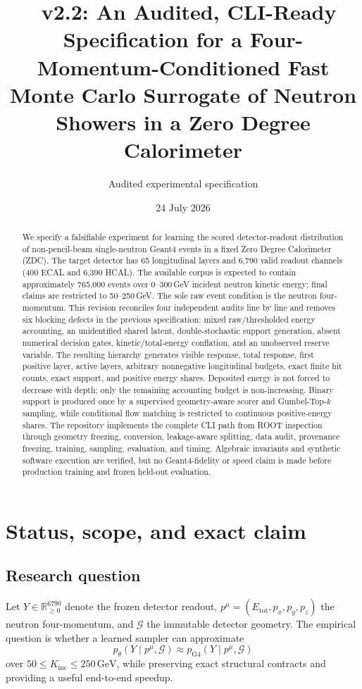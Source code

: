 \documentclass[10pt,a4paper]{article}
\title{\model\ v2.2: An Audited, CLI-Ready Specification for a Four-Momentum-Conditioned Fast Monte Carlo Surrogate of Neutron Showers in a Zero Degree Calorimeter}
\author{Audited experimental specification}
\date{24 July 2026}
\newcommand{\pFour}{p^{\mu}}
\newcommand{\Kinc}{K_{\mathrm{inc}}}
\newcommand{\Etot}{E_{\mathrm{tot}}}
\newcommand{\GeV}{\,\mathrm{GeV}}
\begin{document}
\maketitle

\begin{abstract}
We specify a falsifiable experiment for learning the scored detector-readout distribution of non-pencil-beam single-neutron Geant4 events in a fixed Zero Degree Calorimeter (ZDC). The target detector has 65 longitudinal layers and 6,790 valid readout channels (400 ECAL and 6,390 HCAL). The available corpus is expected to contain approximately 765,000 events over 0--300\,GeV incident neutron kinetic energy; final claims are restricted to 50--250\,GeV. The sole raw event condition is the neutron four-momentum. This revision reconciles four independent audits line by line and removes six blocking defects in the previous specification: mixed raw/thresholded energy accounting, an unidentified shared latent, double-stochastic support generation, absent numerical decision gates, kinetic/total-energy conflation, and an unobserved reserve variable. The resulting hierarchy generates visible response, total response, first positive layer, active layers, arbitrary nonnegative longitudinal budgets, exact finite hit counts, exact support, and positive energy shares. Deposited energy is not forced to decrease with depth; only the remaining accounting budget is non-increasing. Binary support is produced once by a supervised geometry-aware scorer and Gumbel-Top-$k$ sampling, while conditional flow matching is restricted to continuous positive-energy shares. The repository implements the complete CLI path from ROOT inspection through geometry freezing, conversion, leakage-aware splitting, data audit, provenance freezing, training, sampling, evaluation, and timing. Algebraic invariants and synthetic software execution are verified, but no Geant4-fidelity or speed claim is made before production training and frozen held-out evaluation.
\end{abstract}

\tableofcontents
\newpage

\section{Status, scope, and exact claim}

\subsection{Research question}
Let $Y\in\mathbb{R}_{\ge 0}^{6790}$ denote the frozen detector readout, $\pFour=(\Etot,p_x,p_y,p_z)$ the neutron four-momentum, and $\mathcal G$ the immutable detector geometry. The empirical question is whether a learned sampler can approximate
\begin{equation}
 p_{\theta}(Y\mid \pFour,\mathcal G) \approx p_{\mathrm{G4}}(Y\mid \pFour,\mathcal G)
 \label{eq:target}
\end{equation}
over $50\le \Kinc\le250\GeV$, while preserving exact structural contracts and providing a useful end-to-end speedup.
\end{document}

